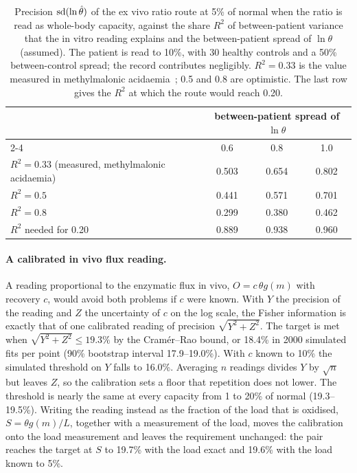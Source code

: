 \begin{table}[htbp]
\centering\small
\caption{\label{stab:s4mapping}Precision $\operatorname{sd}(\ln \hat\theta)$ of the ex vivo ratio route at 5\% of
normal when the ratio is read as whole-body capacity, against the share $R^2$ of
between-patient variance that the in vitro reading explains and the between-patient spread of
$\ln\theta$ (assumed). The patient is read to 10\%, with 30 healthy controls and a 50\%
between-control spread; the record contributes negligibly. $R^2=0.33$ is the value measured in
methylmalonic acidaemia~\cite{breath_test_mma}; 0.5 and 0.8 are optimistic. The last row gives
the $R^2$ at which the route would reach 0.20.}
\begin{tabular}{@{}lccc@{}}
\toprule
& \multicolumn{3}{c}{between-patient spread of $\ln\theta$} \\
\cmidrule(l){2-4}
& 0.6 & 0.8 & 1.0 \\
\midrule
$R^2=0.33$ (measured, methylmalonic acidaemia) & 0.503 & 0.654 & 0.802 \\
$R^2=0.5$ & 0.441 & 0.571 & 0.701 \\
$R^2=0.8$ & 0.299 & 0.380 & 0.462 \\
\addlinespace
$R^2$ needed for 0.20 & 0.889 & 0.938 & 0.960 \\
\bottomrule
\end{tabular}
\end{table}

\paragraph{A calibrated in vivo flux reading.} A reading proportional to the enzymatic flux in
vivo, $O=c\,\theta g(m)$ with recovery $c$, would avoid both problems if $c$ were known. With
$Y$ the precision of the reading and $Z$ the uncertainty of $c$ on the log scale, the Fisher
information is exactly that of one calibrated reading of precision $\sqrt{Y^2+Z^2}$. The target
is met when $\sqrt{Y^2+Z^2}\le19.3\%$ by the Cram\'er--Rao bound, or 18.4\% in 2000 simulated fits
per point (90\% bootstrap interval 17.9--19.0\%). With $c$ known to 10\% the simulated threshold
on $Y$ falls to 16.0\%. Averaging $n$ readings divides $Y$ by $\sqrt n$ but leaves $Z$, so the
calibration sets a floor that repetition does not lower. The threshold is nearly the same at
every capacity from 1 to 20\% of normal (19.3--19.5\%). Writing the reading instead as the
fraction of the load that is oxidised, $S=\theta g(m)/L$, together with a measurement of the
load, moves the calibration onto the load measurement and leaves the requirement unchanged: the
pair reaches the target at $S$ to 19.7\% with the load exact and 19.6\% with the load known to
5\%.

